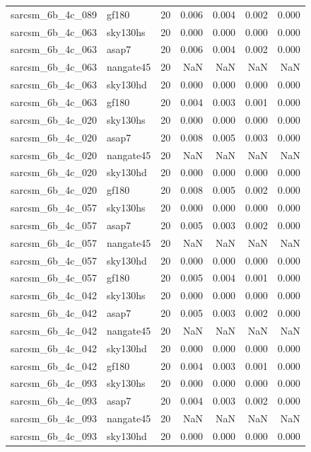 \begin{tabular}{llrrrrr}
sarcsm\_6b\_4c\_089 & gf180 & 20 & 0.006 & 0.004 & 0.002 & 0.000 \\
sarcsm\_6b\_4c\_063 & sky130hs & 20 & 0.000 & 0.000 & 0.000 & 0.000 \\
sarcsm\_6b\_4c\_063 & asap7 & 20 & 0.006 & 0.004 & 0.002 & 0.000 \\
sarcsm\_6b\_4c\_063 & nangate45 & 20 & NaN & NaN & NaN & NaN \\
sarcsm\_6b\_4c\_063 & sky130hd & 20 & 0.000 & 0.000 & 0.000 & 0.000 \\
sarcsm\_6b\_4c\_063 & gf180 & 20 & 0.004 & 0.003 & 0.001 & 0.000 \\
sarcsm\_6b\_4c\_020 & sky130hs & 20 & 0.000 & 0.000 & 0.000 & 0.000 \\
sarcsm\_6b\_4c\_020 & asap7 & 20 & 0.008 & 0.005 & 0.003 & 0.000 \\
sarcsm\_6b\_4c\_020 & nangate45 & 20 & NaN & NaN & NaN & NaN \\
sarcsm\_6b\_4c\_020 & sky130hd & 20 & 0.000 & 0.000 & 0.000 & 0.000 \\
sarcsm\_6b\_4c\_020 & gf180 & 20 & 0.008 & 0.005 & 0.002 & 0.000 \\
sarcsm\_6b\_4c\_057 & sky130hs & 20 & 0.000 & 0.000 & 0.000 & 0.000 \\
sarcsm\_6b\_4c\_057 & asap7 & 20 & 0.005 & 0.003 & 0.002 & 0.000 \\
sarcsm\_6b\_4c\_057 & nangate45 & 20 & NaN & NaN & NaN & NaN \\
sarcsm\_6b\_4c\_057 & sky130hd & 20 & 0.000 & 0.000 & 0.000 & 0.000 \\
sarcsm\_6b\_4c\_057 & gf180 & 20 & 0.005 & 0.004 & 0.001 & 0.000 \\
sarcsm\_6b\_4c\_042 & sky130hs & 20 & 0.000 & 0.000 & 0.000 & 0.000 \\
sarcsm\_6b\_4c\_042 & asap7 & 20 & 0.005 & 0.003 & 0.002 & 0.000 \\
sarcsm\_6b\_4c\_042 & nangate45 & 20 & NaN & NaN & NaN & NaN \\
sarcsm\_6b\_4c\_042 & sky130hd & 20 & 0.000 & 0.000 & 0.000 & 0.000 \\
sarcsm\_6b\_4c\_042 & gf180 & 20 & 0.004 & 0.003 & 0.001 & 0.000 \\
sarcsm\_6b\_4c\_093 & sky130hs & 20 & 0.000 & 0.000 & 0.000 & 0.000 \\
sarcsm\_6b\_4c\_093 & asap7 & 20 & 0.004 & 0.003 & 0.002 & 0.000 \\
sarcsm\_6b\_4c\_093 & nangate45 & 20 & NaN & NaN & NaN & NaN \\
sarcsm\_6b\_4c\_093 & sky130hd & 20 & 0.000 & 0.000 & 0.000 & 0.000 \\

\end{tabular}
